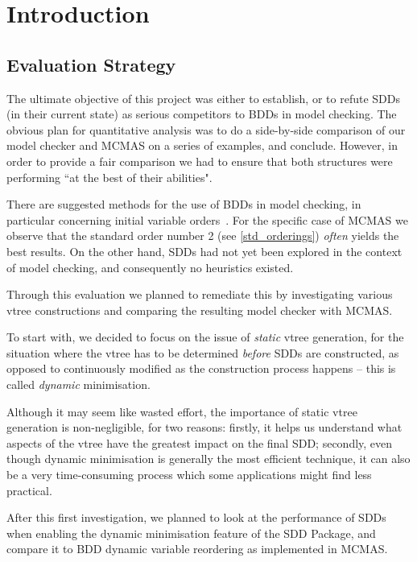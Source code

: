 \documentclass[11pt]{report}
\begin{document}
\section{Introduction}

\subsection{Evaluation Strategy}

The ultimate objective of this project was either to establish, or to refute SDDs (in their current state) as serious competitors to BDDs in model checking. The obvious plan for quantitative analysis was to do a side-by-side comparison of our model checker and MCMAS on a series of examples, and conclude. However, in order to provide a fair comparison we had to ensure that both structures were performing ``at the best of their abilities". 

There are suggested methods for the use of BDDs in model checking, in particular concerning initial variable orders~\cite{bdd_heuristics}. For the specific case of MCMAS we observe that the standard order number 2 (see \ref{std_orderings}) \textit{often} yields the best results.
On the other hand, SDDs had not yet been explored in the context of model checking, and consequently no heuristics existed. 

Through this evaluation we planned to remediate this by investigating various vtree constructions and comparing the resulting model checker with MCMAS. 

To start with, we decided to focus on the issue of \textit{static} vtree generation, for the situation where the vtree has to be determined \textit{before} SDDs are constructed, as opposed to continuously modified as the construction process happens -- this is called \textit{dynamic} minimisation. 

Although it may seem like wasted effort, the importance of static vtree generation is non-negligible, for two reasons: firstly, it helps us understand what aspects of the vtree have the greatest impact on the final SDD; secondly, even though dynamic minimisation is generally the most efficient technique, it can also be a very time-consuming process which some applications might find less practical. 

After this first investigation, we planned to look at the performance of SDDs when enabling the dynamic minimisation feature of the SDD Package, and compare it to BDD dynamic variable reordering as implemented in MCMAS.
\end{document}
